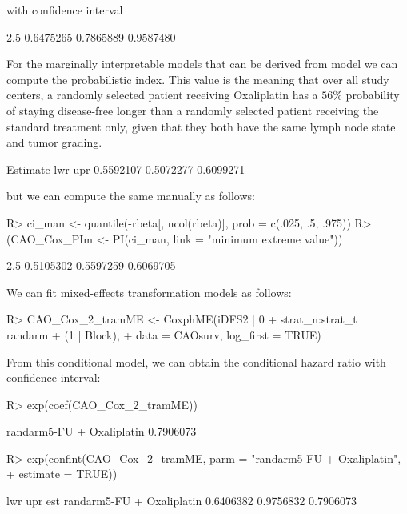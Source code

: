 \documentclass[article,nojss,shortnames]{jss}\usepackage[]{graphicx}\usepackage[]{xcolor}
\begin{document}
with confidence interval
\begin{Schunk}
\begin{Soutput}
     2.5%       50%     97.5% 
0.6475265 0.7865889 0.9587480 
\end{Soutput}
\end{Schunk}
For the marginally interpretable models that can be derived from model
 we can compute the probabilistic index.
This value is the meaning that over all study centers, a randomly selected patient 
receiving Oxaliplatin has a $56\%$ probability of staying disease-free
longer than a randomly
selected patient receiving the standard treatment only, given that they both 
have the same lymph node state and tumor grading.
\begin{Schunk}
\begin{Soutput}
 Estimate       lwr       upr 
0.5592107 0.5072277 0.6099271 
\end{Soutput}
\end{Schunk}
but we can compute the same manually as follows:
\begin{Schunk}
\begin{Sinput}
R> ci_man <- quantile(-rbeta[, ncol(rbeta)], prob = c(.025, .5, .975))
R> (CAO_Cox_PIm <- PI(ci_man, link = "minimum extreme value"))
\end{Sinput}
\begin{Soutput}
     2.5%       50%     97.5% 
0.5105302 0.5597259 0.6069705 
\end{Soutput}
\end{Schunk}
We can fit mixed-effects transformation models 
\citep{tamasi2021tramme,Tamasi_Crowther_Puhan_2022} as follows:
\begin{Schunk}
\begin{Sinput}
R> CAO_Cox_2_tramME <- CoxphME(iDFS2 | 0 + strat_n:strat_t ~ randarm + (1 | Block), 
+                              data = CAOsurv, log_first = TRUE)
\end{Sinput}
\end{Schunk}
From this conditional model, we can obtain the conditional hazard ratio with
confidence interval:
\begin{Schunk}
\begin{Sinput}
R> exp(coef(CAO_Cox_2_tramME))
\end{Sinput}
\begin{Soutput}
randarm5-FU + Oxaliplatin 
                0.7906073 
\end{Soutput}
\begin{Sinput}
R> exp(confint(CAO_Cox_2_tramME, parm = "randarm5-FU + Oxaliplatin", 
+              estimate = TRUE))
\end{Sinput}
\begin{Soutput}
                                lwr       upr       est
randarm5-FU + Oxaliplatin 0.6406382 0.9756832 0.7906073
\end{Soutput}
\end{Schunk}
\end{document}
